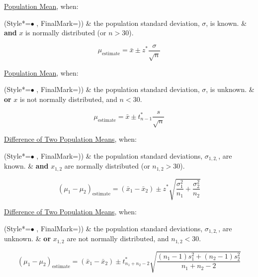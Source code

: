 \underline{Population Mean}, when:
\begin{easylist}[itemize]
\ListProperties(Style*=$\bullet$ , FinalMark={)})
\vspace{-2.0mm}
& the population standard deviation, $\sigma$, is known.
\vspace{-3.5mm}
& \textbf{and} $x$ is normally distributed (or $n>30$).
\end{easylist}
% 
\vspace{-5.0mm}
\begin{equation}
\mu_{\textrm{estimate}} = \bar{x} \pm z^{*} \frac{\sigma}{\sqrt{n}}
\end{equation}

\underline{Population Mean}, when:
\begin{easylist}[itemize]
\ListProperties(Style*=$\bullet$ , FinalMark={)})
\vspace{-2.0mm}
& the population standard deviation, $\sigma$, is unknown.
\vspace{-3.5mm}
& \textbf{or} $x$ is not normally distributed, and $n < 30$.
\end{easylist}
% 
\vspace{-5.0mm}
\begin{equation}
\mu_{\textrm{estimate}} = \bar{x} \pm t^{*}_{n-1} \frac{s}{\sqrt{n}}
\end{equation}

\underline{Difference of Two Population Means}, when:
\begin{easylist}[itemize]
\ListProperties(Style*=$\bullet$ , FinalMark={)})
\vspace{-2.0mm}
& the population standard deviations, $\sigma_{1,2,}$, are known.
\vspace{-3.5mm}
& \textbf{and} $x_{1,2}$ are normally distributed (or $n_{1,2}>30$).
\end{easylist}
% 
\vspace{-5.0mm}
\begin{equation}
(\mu_1 - \mu_2)_{\textrm{estimate}} = (\bar{x}_1 - \bar{x}_2) \pm z^{*} \sqrt{\frac{\sigma_1^2}{n_1} + \frac{\sigma_2^2}{n_2}}
\end{equation}

\underline{Difference of Two Population Means}, when:
\begin{easylist}[itemize]
\ListProperties(Style*=$\bullet$ , FinalMark={)})
\vspace{-2.0mm}
& the population standard deviations, $\sigma_{1,2,}$, are unknown.
\vspace{-3.5mm}
& \textbf{or} $x_{1,2}$ are not normally distributed, and $n_{1,2}<30$.
\end{easylist}
% 
\vspace{-5.0mm}
\begin{equation}
(\mu_1 - \mu_2)_{\textrm{estimate}} = (\bar{x}_1 - \bar{x}_2) \pm t_{n_1+n_2-2}^{*} \sqrt{\frac{(n_1-1)s_1^2 + (n_2-1)s_2^2}{n_1+n_2-2}}
\end{equation}

